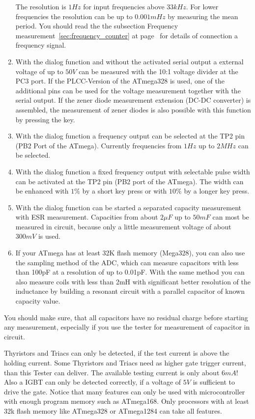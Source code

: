 \begin{enumerate}
The resolution is \(1Hz\) for input frequencies above \(33kHz\).
For lower frequencies the resolution can be up to \(0.001mHz\) by measuring the mean period.
You should read the the subsection Frequency measurement~\ref{sec:frequency_counter} at page~\pageref{sec:frequency_counter} 
for details of connection a frequency signal.
\item With the dialog function and without the activated serial output a external voltage of up to \(50V\) can be measured with
the 10:1 voltage divider at the PC3 port. If the PLCC-Version of the ATmega328 is used, one of the additional
pins can be used for the voltage measurement together with the serial output.
If the zener diode measurement extension (DC-DC converter) is assembled, the measurement of
zener diodes is also possible with this function by pressing the key.
\item With the dialog function a frequency output can be selected at the TP2 pin (PB2 Port of the ATmega).
Currently frequencies from \(1Hz\) up to \(2MHz\) can be selected.
\item With the dialog function a fixed frequency output with selectable pulse width can be activated at the TP2 pin
(PB2 port of the ATmega). The width can be enhanced with \(1\%\) by a short key press or with \(10\%\) by a longer key press.
\item With the dialog function can be started a separated capacity measurement with ESR measurement.
Capacities from about \(2\mu F\) up to \(50mF\) can most be measured in circuit, because only a little
measurement voltage of about \(300mV\) is used.
\item If your ATmega has at least 32K flash memory (Mega328), you can also use the sampling method of the ADC,
which can measure capacitors with less than 100pF at a resolution of up to 0.01pF.
With the same method you can also measure coils with less than 2mH with significant better resolution of the inductance
by building a resonant circuit with a parallel capacitor of known capacity value.

\end{enumerate}

You should make sure, that all capacitors have no residual charge before starting any measurement,
especially if you use the tester for measurement of capacitor in circuit.


Thyristors and Triacs can only be detected, if the test current is above the holding current.
Some Thyristors and Triacs need as higher gate trigger current, than this Tester can deliver.
The available testing current is only about \(6mA\)!
Also a IGBT can only be detected correctly, if a voltage of \(5V\) is sufficient to drive the gate.
Notice that many features can only be used with microcontroller with enough program memory such as ATmega168.
Only processors with at least 32k flash memory like ATmega328 or ATmega1284 can take all features.

